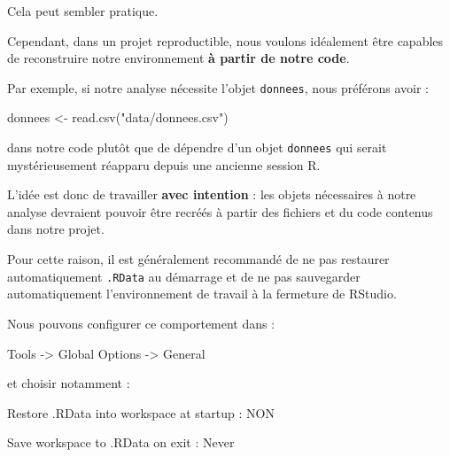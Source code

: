 \documentclass[
  letterpaper,
  DIV=11,
  numbers=noendperiod]{scrreprt}
\newenvironment{Shaded}{\begin{snugshade}}{\end{snugshade}}
\newcommand{\FunctionTok}[1]{\textcolor[rgb]{0.28,0.35,0.67}{#1}}
\newcommand{\NormalTok}[1]{\textcolor[rgb]{0.00,0.23,0.31}{#1}}
\newcommand{\OtherTok}[1]{\textcolor[rgb]{0.00,0.23,0.31}{#1}}
\newcommand{\StringTok}[1]{\textcolor[rgb]{0.13,0.47,0.30}{#1}}
\begin{document}
Cela peut sembler pratique.

Cependant, dans un projet reproductible, nous voulons idéalement être
capables de reconstruire notre environnement \textbf{à partir de notre
code}.

Par exemple, si notre analyse nécessite l'objet \texttt{donnees}, nous
préférons avoir :

\begin{Shaded}
\begin{Highlighting}[]
\NormalTok{donnees }\OtherTok{\textless{}{-}} \FunctionTok{read.csv}\NormalTok{(}\StringTok{"data/donnees.csv"}\NormalTok{)}
\end{Highlighting}
\end{Shaded}

dans notre code plutôt que de dépendre d'un objet \texttt{donnees} qui
serait mystérieusement réapparu depuis une ancienne session R.

L'idée est donc de travailler \textbf{avec intention} : les objets
nécessaires à notre analyse devraient pouvoir être recréés à partir des
fichiers et du code contenus dans notre projet.

Pour cette raison, il est généralement recommandé de ne pas restaurer
automatiquement \texttt{.RData} au démarrage et de ne pas sauvegarder
automatiquement l'environnement de travail à la fermeture de RStudio.

Nous pouvons configurer ce comportement dans :

\begin{Shaded}
\begin{Highlighting}[]
\NormalTok{Tools {-}\textgreater{} Global Options {-}\textgreater{} General}
\end{Highlighting}
\end{Shaded}

et choisir notamment :

\begin{Shaded}
\begin{Highlighting}[]
\NormalTok{Restore .RData into workspace at startup : NON}

\NormalTok{Save workspace to .RData on exit : Never}
\end{Highlighting}
\end{Shaded}
\end{document}

